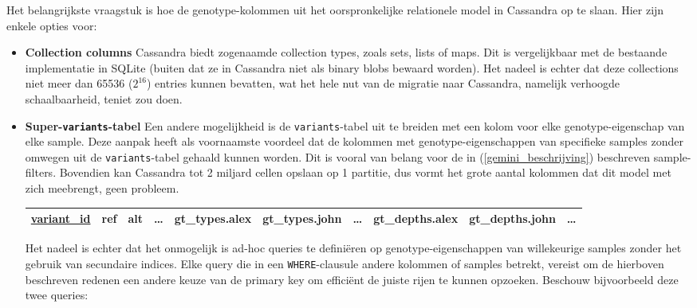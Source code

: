 Het belangrijkste vraagstuk is hoe de genotype-kolommen uit het oorspronkelijke relationele model in Cassandra op te slaan. Hier zijn enkele opties voor:

\begin{itemize}

\item \textbf{Collection columns} Cassandra biedt zogenaamde collection types, zoals sets, lists of maps. Dit is vergelijkbaar met de bestaande implementatie in SQLite (buiten dat ze in Cassandra niet als binary blobs bewaard worden). Het nadeel is echter dat deze collections niet meer dan 65536 ($2^{16}$) entries kunnen bevatten, wat het hele nut van de migratie naar Cassandra, namelijk verhoogde schaalbaarheid, teniet zou doen.

\item \textbf{Super-\texttt{variants}-tabel} Een andere mogelijkheid is de \texttt{variants}-tabel uit te breiden met een kolom voor elke genotype-eigenschap van elke sample. Deze aanpak heeft als voornaamste voordeel dat de kolommen met genotype-eigenschappen van specifieke samples zonder omwegen uit de \texttt{variants}-tabel gehaald kunnen worden. Dit is vooral van belang voor de in (\ref{gemini_beschrijving}) beschreven sample-filters. Bovendien kan Cassandra tot 2 miljard cellen opslaan op 1 partitie, dus vormt het grote aantal kolommen dat dit model met zich meebrengt, geen probleem.\\

\begin{table}[!h]
\begin{adjustwidth}{-0.75in}{}
\begin{tabular}{@{}|l|l|l|l|l|l|l|l|l|l|@{}}
\toprule
\color{ForestGreen} \underline{variant\_id} & ref & alt & \ldots & gt\_types.alex & gt\_types.john & \ldots & gt\_depths.alex & gt\_depths.john & \ldots \\ \bottomrule
\end{tabular}
\end{adjustwidth}
\end{table}

Het nadeel is echter dat het onmogelijk is ad-hoc queries te defini\"eren op genotype-eigenschappen van willekeurige samples zonder het gebruik van secundaire indices. Elke query die in een \texttt{WHERE}-clausule andere kolommen of samples betrekt, vereist om de hierboven beschreven redenen een andere keuze van de primary key om effici\"ent de juiste rijen te kunnen opzoeken. Beschouw bijvoorbeeld deze twee queries:\\ 


\end{itemize}
